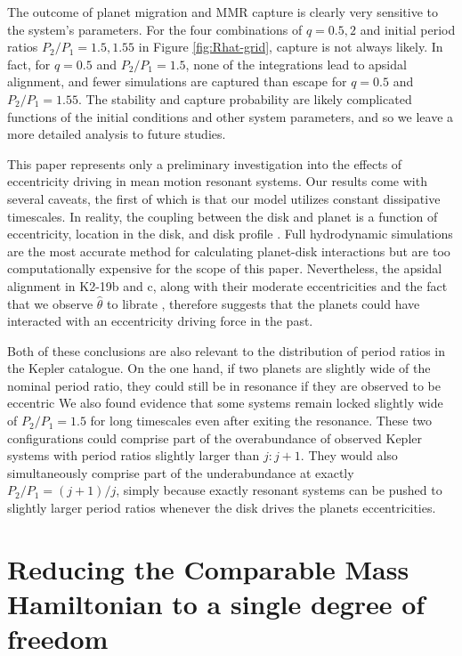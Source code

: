 \documentclass[usenatbib,twocolumn]{mnras}
\begin{document}
\noindent

The outcome of planet migration and MMR capture is
clearly very sensitive to the system's parameters.  For the four
combinations of \(q=0.5,2\) and initial period ratios \(P_2/P_1=1.5,1.55\)
in Figure \ref{fig:Rhat-grid}, capture is not always likely. In fact,
for \(q=0.5\) and \(P_2/P_1=1.5\), none of the integrations lead to
apsidal alignment, and fewer simulations are captured than escape for
\(q=0.5\) and \(P_2/P_1=1.55\).  The stability and capture probability are
likely complicated functions of the initial conditions and other
system parameters, and so we leave a more detailed analysis to future
studies.

This paper represents only a preliminary investigation into the
effects of eccentricity driving in mean motion resonant systems. Our
results come with several caveats, the first of which is that our
model utilizes constant dissipative timescales. In reality, the
coupling between the disk and planet is a function of eccentricity,
location in the disk, and disk profile
\citep{cresswell_evolution_2006,cresswell_three-dimensional_2008}.  Full
hydrodynamic simulations are the most accurate method for calculating
planet-disk interactions but are too computationally expensive for the
scope of this paper.  Nevertheless, the apsidal alignment in K2-19b
and c, along with their moderate eccentricities and the fact that we
observe \(\hat\theta\) to librate \citep{petit_resonance_2020}, therefore
suggests that the planets could have interacted with an eccentricity
driving force in the past.

Both of these conclusions are also relevant to the distribution of
period ratios in the Kepler catalogue.  On the one hand, if two
planets are slightly wide of the nominal period ratio, they could
still be in resonance if they are observed to be eccentric \citep[e.g., ][]{petit_resonance_2020}  We also
found evidence that some systems remain locked slightly wide of
\(P_2/P_1=1.5\) for long timescales even after exiting the resonance.
These two configurations could comprise part of the overabundance of
observed Kepler systems with period ratios slightly larger than
\(j:j+1\). They would also simultaneously comprise part of the
underabundance at exactly \(P_2/P_1 = (j+1)/j\), simply because exactly
resonant systems can be pushed to slightly larger period ratios
whenever the disk drives the planets eccentricities.


\clearpage
\onecolumn
\appendix
\section{Reducing the Comparable Mass Hamiltonian to a single degree of freedom}
\label{sec:org884e133}
\end{document}
